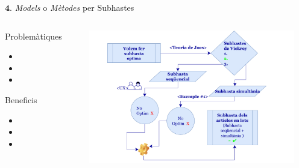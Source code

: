 \documentclass[twocolumn]{beamer}
\begin{document}
\begin{frame}{$\mathbf 4.$ \textit{Models} o \textit{Mètodes} per Subhastes}
\begin{columns}[t]
	\begin{column}{.3\textwidth}
		\begin{block}{Problemàtiques}
		\begin{itemize}
			\item
			\item
			\item
		\end{itemize}
		\end{block}
	
	\begin{block}{Beneficis}
		\begin{itemize}
		\item
		\item
		\item
		\end{itemize}
	\end{block}
	\end{column}
	\begin{column}{.7\textwidth}
		
		\includegraphics[width=9cm]{subs}	 
		
	\end{column}
\end{columns}
\end{frame}
\end{document}
